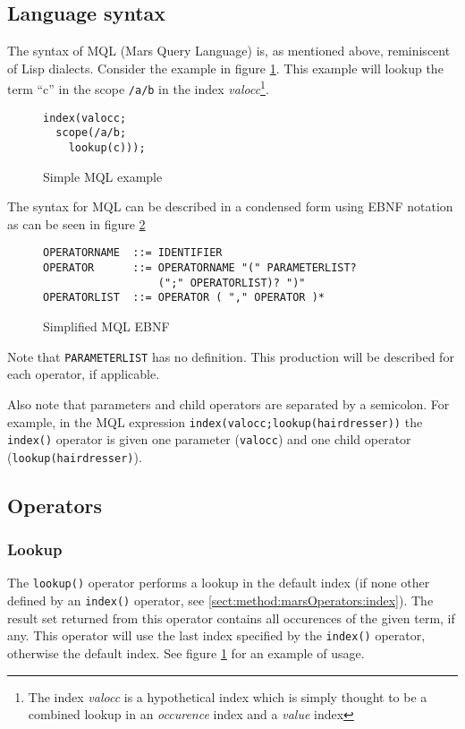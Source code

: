 \subsection{Language syntax}
The syntax of MQL (Mars Query Language) is, as mentioned above, reminiscent of
Lisp dialects. Consider the example in figure \ref{figure:mql:op_example}. This
example will lookup the term ``c'' in the scope \texttt{/a/b} in the index
\textit{valocc}\footnote{The index \textit{valocc} is a hypothetical index
which is simply thought to be a combined lookup in an \textit{occurence}
index and a \textit{value} index}.

\begin{figure}[!h]
\centering
\begin{Verbatim}
index(valocc; 
  scope(/a/b;
    lookup(c)));
\end{Verbatim}
\caption{Simple MQL example}
\label{figure:mql:op_example}
\end{figure}

The syntax for MQL can be described in a condensed form using EBNF notation as
can be seen in figure \ref{figure:mql:ebnf}
\begin{figure}[!h]
\centering
\begin{Verbatim}
OPERATORNAME  ::= IDENTIFIER
OPERATOR      ::= OPERATORNAME "(" PARAMETERLIST? 
                  (";" OPERATORLIST)? ")"
OPERATORLIST  ::= OPERATOR ( "," OPERATOR )*
\end{Verbatim}
\caption{Simplified MQL EBNF}
\label{figure:mql:ebnf}
\end{figure}

Note that \texttt{PARAMETERLIST} has no definition. This production will be
described for each operator, if applicable.

Also note that parameters and child operators are separated by a semicolon. For
example, in the MQL expression \texttt{index(valocc;lookup(hairdresser))} the
\texttt{index()} operator is given one parameter (\texttt{valocc}) and one
child operator (\texttt{lookup(hairdresser)}).

\subsection{Operators}
\label{sect:method:marsOperators}
\subsubsection{Lookup}
\label{sect:method:marsOperators:lookup}
The \texttt{lookup()} operator performs a lookup in the default index (if none
other defined by an \texttt{index()} operator, see
\ref{sect:method:marsOperators:index}). The result set returned from this
operator contains all occurences of the given term, if any. This operator will
use the last index specified by the \texttt{index()} operator, otherwise the
default index. See figure \ref{figure:mql:op_example} for an example of usage. 


